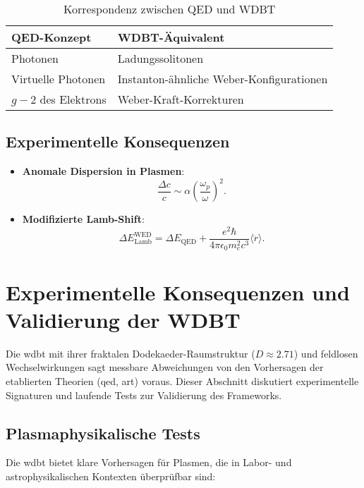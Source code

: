 \begin{table}[ht]
\centering
\begin{tabular}{ll}
\toprule
\textbf{QED-Konzept} & \textbf{WDBT-Äquivalent} \\
\midrule
Photonen & Ladungssolitonen \\
Virtuelle Photonen & Instanton-ähnliche Weber-Konfigurationen \\
$g-2$ des Elektrons & Weber-Kraft-Korrekturen \\
\bottomrule
\end{tabular}
\caption{Korrespondenz zwischen QED und WDBT}
\end{table}

\subsection{Experimentelle Konsequenzen}
\begin{itemize}
    \item \textbf{Anomale Dispersion in Plasmen}:  
    \begin{equation}
    \frac{\Delta c}{c} \sim \alpha \left(\frac{\omega_p}{\omega}\right)^2.
    \end{equation}
    \item \textbf{Modifizierte Lamb-Shift}:  
    \begin{equation}
    \Delta E_{\text{Lamb}}^{\text{WED}} = \Delta E_{\text{QED}} + \frac{e^2 \hbar}{4\pi \epsilon_0 m_e^2 c^3} \langle \ddot{r} \rangle.
    \end{equation}
\end{itemize}

\section{Experimentelle Konsequenzen und Validierung der WDBT}
\label{sec:experimentelle_konsequenzen}  

Die \gls{wdbt} mit ihrer fraktalen Dodekaeder-Raumstruktur ($D \approx 2.71$) und feldlosen Wechselwirkungen sagt messbare Abweichungen von den Vorhersagen der etablierten Theorien
(\gls{qed}, \gls{art}) voraus. Dieser Abschnitt diskutiert experimentelle Signaturen und laufende Tests zur Validierung des Frameworks.  

\subsection{Plasmaphysikalische Tests}
Die \gls{wdbt} bietet klare Vorhersagen für Plasmen, die in Labor- und astrophysikalischen Kontexten überprüfbar sind:

